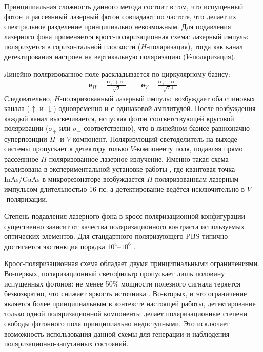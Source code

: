 \documentclass[11pt]{article}    %
\numberwithin{equation}{section}
\begin{document}
Принципиальная сложность данного метода состоит в том, что испущенный фотон
и рассеянный лазерный фотон совпадают по частоте, что делает их спектральное
разделение принципиально невозможным.
Для подавления лазерного фона применяется %
кросс-поляризационная схема:
лазерный импульс поляризуется в горизонтальной плоскости ($H$-поляризация),
тогда как канал детектирования настроен на вертикальную поляризацию ($V$-поляризация).

Линейно поляризованное поле раскладывается по циркулярному базису:
\begin{gather}
    \mathbf{e}_H = \frac{\boldsymbol{\sigma}_+ + \boldsymbol{\sigma}_-}{\sqrt{2}}
    \qquad
    \mathbf{e}_V = \frac{\boldsymbol{\sigma}_+ - \boldsymbol{\sigma}_-}{\sqrt{2}\,i}
\end{gather}
Следовательно, $H$-поляризованный лазерный импульс возбуждает оба спиновых
канала ($\uparrow$ и $\downarrow$) одновременно и с одинаковой амплитудой.
После возбуждения каждый канал высвечивается, испуская фотон соответствующей
круговой поляризации ($\sigma_+$ или $\sigma_-$ соответственно), что в линейном
базисе равнозначно суперпозиции $H$- и $V$-компонент.
Поляризующий светоделитель на выходе системы пропускает к детектору
только $V$-компоненту поля, подавляя прямо рассеянное $H$-поляризованное
лазерное излучение.
Именно такая схема реализована в экспериментальной установке работы
\cite{krainov2025}, где квантовая точка InAs/GaAs в микрорезонаторе
возбуждается $H$-поляризованным лазерным импульсом длительностью 16 пс,
а детектирование ведётся исключительно в $V$-поляризации.

Степень подавления лазерного фона в кросс-поляризационной конфигурации
существенно зависит от качества поляризационного контраста используемых
оптических элементов.
Для стандартного поляризующего PBS типично достигается экстинкция
порядка $10^4$--$10^6$ \cite{matthiesen2012, muller2007}.

Кросс-поляризационная схема обладает двумя
принципиальными ограничениями.
Во-первых, поляризационный светофильтр пропускает лишь половину испущенных
фотонов: не менее 50\% мощности полезного сигнала теряется безвозвратно,
что снижает яркость источника \cite{he2019}.
Во-вторых, и это ограничение является более принципиальным в контексте
настоящей работы, детектирование только одной поляризационной компоненты
делает поляризационные степени свободы фотонного поля принципиально
недоступными.
Это исключает возможность использования данной схемы для генерации и
наблюдения поляризационно-запутанных состояний.
\end{document}
